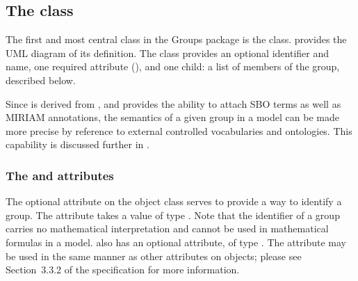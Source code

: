 \subsection{The  class}
\label{group-class}

The first and most central class in the Groups package is the \Group class.   provides the UML diagram of its definition.  The \Group class provides an optional identifier and name, one required attribute (), and one child:  a list of members of the group, described below.

Since \Group is derived from \SBase, and \SBase provides the ability to attach SBO terms as well as MIRIAM annotations, the semantics of a given group in a model can be made more precise by reference to external controlled vocabularies and ontologies.  This capability is discussed further in .


\subsubsection{The \fixttspace{} and \fixttspace{} attributes}
\label{group-idname-attributes}

The optional  attribute on the \Group object class serves to provide a way to identify a group.  The attribute takes a value of type .  Note that the identifier of a group carries no mathematical interpretation and cannot be used in mathematical formulas in a model.  \Group also has an optional  attribute, of type .  The  attribute may be used in the same manner as other  attributes on \sbmlthreecore objects; please see Section~3.3.2 of the \sbmlthreecore specification for more information.


